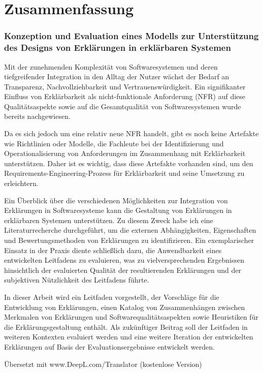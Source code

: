 \chapter*{Zusammenfassung}

\subsection*{Konzeption und Evaluation eines Modells zur Unterstützung des Designs von Erklärungen in erklärbaren Systemen}

Mit der zunehmenden Komplexität von Softwaresystemen und deren tiefgreifender Integration in den Alltag der Nutzer wächst der Bedarf an Transparenz, Nachvollziehbarkeit und Vertrauenswürdigkeit. Ein signifikanter Einfluss von Erklärbarkeit als nicht-funktionale Anforderung (NFR) auf diese Qualitätsaspekte sowie auf die Gesamtqualität von Softwaresystemen wurde bereits nachgewiesen.

Da es sich jedoch um eine relativ neue NFR handelt, gibt es noch keine Artefakte wie Richtlinien oder Modelle, die Fachleute bei der Identifizierung und Operationalisierung von Anforderungen im Zusammenhang mit Erklärbarkeit unterstützen. Daher ist es wichtig, dass diese Artefakte vorhanden sind, um den Requirements-Engineering-Prozess für Erklärbarkeit und seine Umsetzung zu erleichtern.

Ein Überblick über die verschiedenen Möglichkeiten zur Integration von Erklärungen in Softwaresysteme kann die Gestaltung von Erklärungen in erklärbaren Systemen unterstützen. Zu diesem Zweck habe ich eine Literaturrecherche durchgeführt, um die externen Abhängigkeiten, Eigenschaften und Bewertungsmethoden von Erklärungen zu identifizieren. Ein exemplarischer Einsatz in der Praxis diente schließlich dazu, die Anwendbarkeit eines entwickelten Leitfadens zu evaluieren, was zu vielversprechenden Ergebnissen hinsichtlich der evaluierten Qualität der resultierenden Erklärungen und der subjektiven Nützlichkeit des Leitfadens führte. 

In dieser Arbeit wird ein Leitfaden vorgestellt, der Vorschläge für die Entwicklung von Erklärungen, einen Katalog von Zusammenhängen zwischen Merkmalen von Erklärungen und Softwarequalitätsaspekten sowie Heuristiken für die Erklärungsgestaltung enthält. Als zukünftiger Beitrag soll der Leitfaden in weiteren Kontexten evaluiert werden und eine weitere Iteration der entwickelten Erklärungen auf Basis der Evaluationsergebnisse entwickelt werden.

Übersetzt mit www.DeepL.com/Translator (kostenlose Version)

